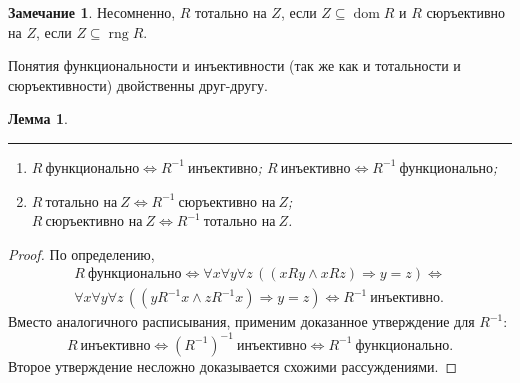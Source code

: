 \documentclass[12pt,notitlepage]{article}
\theoremstyle{plain}
\newtheorem{lemma}[thm]{Лемма}
\theoremstyle{definition}
\newtheorem{rem}[thm]{Замечание}
\theoremstyle{plain}
\newcommand{\sbs}{\subseteq}
\newcommand{\dom}{\mathop{\mathrm{dom}}}
\newcommand{\rng}{\mathop{\mathrm{rng}}}
\newcommand{\1}{\mathbf{1}}
\newcommand{\0}{\mathbf{0}}
\newcommand{\ply}{\Longrightarrow}
\begin{document}
\begin{rem}
	Несомненно, $R$ тотально на $Z$, если $Z \sbs \dom R$ и $R$ сюръективно на $Z$, если $Z \sbs \rng R$.
\end{rem}


Понятия функциональности и инъективности (так же как и тотальности и сюръективности) двойственны друг-другу.
\begin{lemma}\label{ch0:fnc_inv}\rule{1pt}{0pt}
	\begin{enumerate}
		\item $R\ \mbox{функционально} \iff R^{-1}\ \mbox{инъективно}$; $R\ \mbox{инъективно} \iff R^{-1}\ \mbox{функционально}$;
		\item $R\ \mbox{тотально на}\ Z \iff R^{-1}\ \mbox{сюръективно на}\ Z$; $R\ \mbox{сюръективно на}\ Z \iff R^{-1}\ \mbox{тотально на}\ Z$.
	\end{enumerate}
\end{lemma}
\begin{proof}
	По определению,
	\begin{multline*}
		R\ \mbox{функционально} \iff \forall x \forall y \forall z\, ( (x R y \wedge x R z) \ply y = z ) \iff\\
		\forall x \forall y \forall z\, ( (y R^{-1} x \wedge z R^{-1} x) \ply y = z )  \iff R^{-1}\ \mbox{инъективно}.
	\end{multline*}
	Вместо аналогичного расписывания, применим доказанное утверждение для $R^{-1}$:
	$$
	R\ \mbox{инъективно} \iff (R^{-1})^{-1}\ \mbox{инъективно} \iff R^{-1}\ \mbox{функционально}.
	$$
	Второе утверждение несложно доказывается схожими рассуждениями.
\end{proof}
\end{document}
